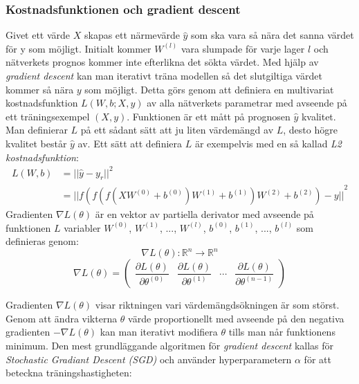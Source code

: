 \documentclass[a4paper,11pt,twoside]{article}
\newcommand*{\pd}[2]{\ensuremath{\dfrac{\partial #1}{\partial #2}}}
\begin{document}
\subsubsection{Kostnadsfunktionen och gradient descent}
Givet ett värde $X$ skapas ett närmevärde $\hat{y}$ som ska vara så nära det sanna värdet för y som möjligt. Initialt kommer $W^{(l)}$ vara slumpade för varje lager $l$ och nätverkets prognos kommer inte efterlikna det sökta värdet. Med hjälp av \textit{gradient descent} kan man iterativt träna modellen så det slutgiltiga värdet kommer så nära $y$ som möjligt. Detta görs genom att definiera en multivariat kostnadsfunktion $L(W, b; X,y)$ av alla nätverkets parametrar med avseende på ett träningsexempel $(X, y)$. Funktionen är ett mått på prognosen $\hat{y}$ kvalitet. Man definierar $L$ på ett sådant sätt att ju liten värdemängd av $L$, desto högre kvalitet består $\hat{y}$ av. Ett sätt att definiera $L$ är exempelvis med en så kallad \textit{L2 kostnadsfunktion}: \cite{cs231n} \cite{wikiStanford}
\begin{equation}
\begin{split}
L(W,b) 	& = {||\hat{y}-y_r||}^2 \\
		& = {||f(f(f(XW^{(0)} +b^{(0)})W^{(1)} +b^{(1)})W^{(2)} +b^{(2)}) - y||}^2
\end{split}
\end{equation}
Gradienten $\nabla L(\theta)$ är en vektor av partiella derivator med avseende på funktionen $L$ variabler $W^{(0)}$, $W^{(1)}$, ..., $W^{(l)}$, $b^{(0)}$, $b^{(1)}$, ..., $b^{(l)}$ som definieras genom: \cite{gradient} \cite{convmath} 
\begin{equation}
\nabla L(\theta) : \mathbb{R}^n \to \mathbb{R}^n
\end{equation}
\begin{equation}
\nabla L(\theta) = 
	\begin{pmatrix} 
		\pd{L(\theta)}{\theta^{(0)}} & 
		\pd{L(\theta)}{\theta^{(1)}} &
		\cdots &
		\pd{L(\theta)}{\theta^{(n-1)}}
		
		\end{pmatrix}
\end{equation}

Gradienten $\nabla L(\theta)$ visar riktningen vari värdemängdsökningen är som störst. Genom att ändra vikterna $\theta$ värde proportionellt med avseende på den negativa gradienten $-\nabla L(\theta)$ kan man iterativt modifiera $\theta$ tills man når funktionens minimum. Den mest grundläggande algoritmen för \textit{gradient descent} kallas för \textit{Stochastic Gradiant Descent (SGD)} och använder hyperparametern $\alpha$ för att beteckna träningshastigheten: \cite{gradient} \cite{convmath} \cite{wikiStanford}
\end{document}
